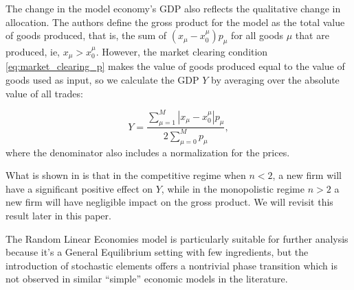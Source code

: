 The change in the model economy's GDP also reflects the qualitative
change in allocation. The authors define the gross product for the
model as the total value of goods produced, that is, the sum of
$(x_\mu - x_0^\mu)p_\mu$ for all goods $\mu$ that are produced, ie,
$x_\mu > x_0^\mu$. However, the market clearing condition
\eqref{eq:market_clearing_p} makes the value of goods produced equal
to the value of goods used as input, so we calculate the GDP $Y$ by
averaging over the absolute value of all trades:

\begin{equation}
  \label{eq:5}
  Y = \frac{\sum_{\mu = 1}^M |x_\mu - x_0^\mu|p_\mu}{2 \sum_{\mu = 0}^M p_\mu},
\end{equation}
where the denominator also includes a normalization for the prices.

What is shown in \cite{DeMartinoMarsili04} is that in the competitive
regime when $n<2$, a new firm will have a significant positive effect
on $Y$, while in the monopolistic regime $n>2$ a new firm will have
negligible impact on the gross product. We will revisit this result
later in this paper.

The Random Linear Economies model is particularly suitable for further
analysis because it's a General Equilibrium setting with few
ingredients, but the introduction of stochastic elements offers a
nontrivial phase transition which is not observed in similar
``simple'' economic models in the literature.